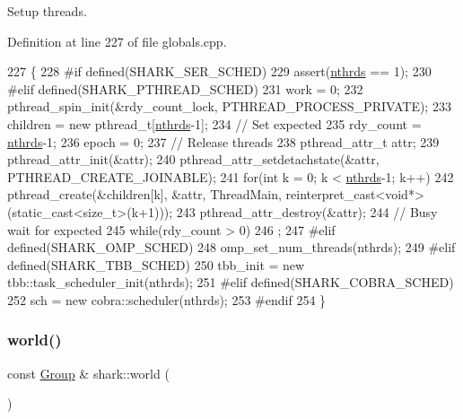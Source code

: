 Setup threads. 

Definition at line 227 of file globals.\+cpp.


\begin{DoxyCode}
227                          \{
228 \textcolor{preprocessor}{#if defined(SHARK\_SER\_SCHED)}
229     assert(\hyperlink{namespaceshark_a4912c1d983c9655b4ed992ac1f99530f}{nthrds} == 1);
230 \textcolor{preprocessor}{#elif defined(SHARK\_PTHREAD\_SCHED)}
231     work = 0;
232     pthread\_spin\_init(&rdy\_count\_lock, PTHREAD\_PROCESS\_PRIVATE);
233     children = \textcolor{keyword}{new} pthread\_t[\hyperlink{namespaceshark_a4912c1d983c9655b4ed992ac1f99530f}{nthrds}-1];
234     \textcolor{comment}{// Set expected}
235     rdy\_count = \hyperlink{namespaceshark_a4912c1d983c9655b4ed992ac1f99530f}{nthrds}-1;
236     epoch = 0;
237     \textcolor{comment}{// Release threads}
238     pthread\_attr\_t attr;
239     pthread\_attr\_init(&attr);
240     pthread\_attr\_setdetachstate(&attr, PTHREAD\_CREATE\_JOINABLE);
241     \textcolor{keywordflow}{for}(\textcolor{keywordtype}{int} k = 0; k < \hyperlink{namespaceshark_a4912c1d983c9655b4ed992ac1f99530f}{nthrds}-1; k++)
242         pthread\_create(&children[k], &attr, ThreadMain, reinterpret\_cast<void*>(static\_cast<size\_t>(k+1)));
243     pthread\_attr\_destroy(&attr);
244     \textcolor{comment}{// Busy wait for expected}
245     \textcolor{keywordflow}{while}(rdy\_count > 0)
246         ;
247 \textcolor{preprocessor}{#elif defined(SHARK\_OMP\_SCHED)}
248     omp\_set\_num\_threads(nthrds);
249 \textcolor{preprocessor}{#elif defined(SHARK\_TBB\_SCHED)}
250     tbb\_init = \textcolor{keyword}{new} tbb::task\_scheduler\_init(nthrds);
251 \textcolor{preprocessor}{#elif defined(SHARK\_COBRA\_SCHED)}
252     sch = \textcolor{keyword}{new} cobra::scheduler(nthrds);
253 \textcolor{preprocessor}{#endif}
254 \}
\end{DoxyCode}
\hypertarget{namespaceshark_a1dc10b4032399f63650dbbb186483e47}{}\label{namespaceshark_a1dc10b4032399f63650dbbb186483e47} 
\subsubsection{\texorpdfstring{world()}{world()}}
{\footnotesize\ttfamily const \hyperlink{classshark_1_1_group}{Group} \& shark\+::world (\begin{DoxyParamCaption}{ }\end{DoxyParamCaption})\hspace{0.3cm}{\ttfamily [inline]}}

